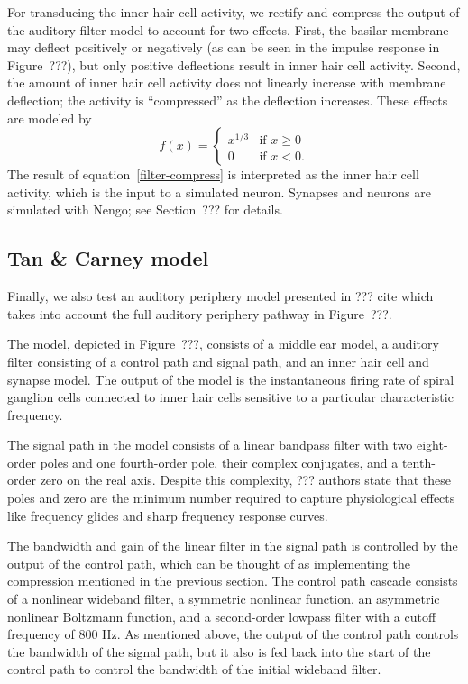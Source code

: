 For transducing the inner hair cell activity,
we rectify and compress the output
of the auditory filter model
to account for two effects.
First, the basilar membrane may deflect
positively or negatively
(as can be seen in the impulse response
in Figure~???),
but only positive deflections result in
inner hair cell activity.
Second, the amount of inner hair cell activity
does not linearly increase with
membrane deflection;
the activity is ``compressed''
as the deflection increases.
These effects are modeled by
\begin{equation} \label{filter-compress}
  f(x) =
  \begin{cases}
    x^{1 / 3} &\text{if } x \ge 0 \\
    0 &\text{if } x < 0.
  \end{cases}
\end{equation}
The result of equation~\eqref{filter-compress}
is interpreted as the inner hair cell activity,
which is the input to a simulated neuron.
Synapses and neurons are simulated with Nengo;
see Section~??? for details.

\subsection{Tan \& Carney model}

Finally, we also test
an auditory periphery model
presented in ??? cite
which takes into account
the full auditory periphery pathway
in Figure~???.

The model, depicted in Figure~???,
consists of a middle ear model,
a auditory filter consisting
of a control path and signal path,
and an inner hair cell
and synapse model.
The output of the model
is the instantaneous firing rate
of spiral ganglion cells
connected to inner hair cells
sensitive to a particular
characteristic frequency.

The signal path in the model
consists of a linear bandpass filter
with two eight-order poles
and one fourth-order pole,
their complex conjugates,
and a tenth-order zero
on the real axis.
Despite this complexity,
??? authors
state that these poles and zero
are the minimum number required
to capture physiological effects
like frequency glides
and sharp frequency response curves.


The bandwidth and gain of the linear filter
in the signal path is controlled
by the output of the control path,
which can be thought of as
implementing the compression
mentioned in the previous section.
The control path cascade consists of
a nonlinear wideband filter,
a symmetric nonlinear function,
an asymmetric nonlinear Boltzmann function,
and a second-order lowpass filter
with a cutoff frequency of 800 Hz.
As mentioned above,
the output of the control path
controls the bandwidth
of the signal path,
but it also is fed back
into the start of the control path
to control the bandwidth of the initial
wideband filter.

